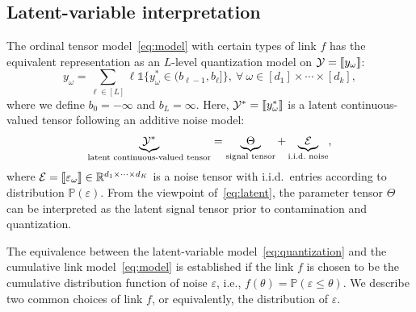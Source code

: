 \documentclass{article}
\theoremstyle{plain}
\theoremstyle{definition}
\newcommand*{\KeepStyleUnderBrace}[1]{%
  \mathop{%
    \mathchoice
    {\underbrace{\displaystyle#1}}%
    {\underbrace{\textstyle#1}}%
    {\underbrace{\scriptstyle#1}}%
    {\underbrace{\scriptscriptstyle#1}}%
  }\limits
}
\begin{document}
\subsection{Latent-variable interpretation}\label{sec:latent}


The ordinal tensor model~\eqref{eq:model} with certain types of link $f$ has the equivalent representation as an $L$-level quantization model on $\mathcal{Y}=\llbracket y_\omega \rrbracket$:
\begin{equation}\label{eq:quantization}
y_\omega=\sum_{\ell\in[L]} \ell \mathds{1}\{y^*_\omega \in(b_{\ell-1},b_\ell]\},\ \forall \ \omega\in[d_1]\times \cdots \times [d_k],
\end{equation}
where we define $b_0=-\infty$ and $b_L=\infty$. Here, $\mathcal{Y}^*=\llbracket y^*_\omega \rrbracket$ is a latent continuous-valued tensor following an additive noise model:
\begin{align}\label{eq:latent}
\KeepStyleUnderBrace{\tY^*}_{\text{latent continuous-valued tensor}}=\KeepStyleUnderBrace{\Theta}_{\text{signal tensor}}+\KeepStyleUnderBrace{\tE}_{\text{i.i.d.\ noise}},
\end{align}
where $\mathcal{E}=\llbracket \varepsilon_\omega \rrbracket\in\mathbb{R}^{d_1\times \cdots \times d_K}$ is a noise tensor with i.i.d.\ entries according to distribution $\mathbb{P}(\varepsilon)$. From the viewpoint of~\eqref{eq:latent}, the parameter tensor $\Theta$ can be interpreted as the latent signal tensor prior to contamination and quantization.

The equivalence between the latent-variable model~\eqref{eq:quantization} and the cumulative link model~\eqref{eq:model} is established if the link $f$ is chosen to be the cumulative distribution function of noise $\varepsilon$, i.e., $f(\theta)=\mathbb{P}(\varepsilon\leq \theta)$. We describe two common choices of link $f$, or equivalently, the distribution of $\varepsilon$.
\end{document}
